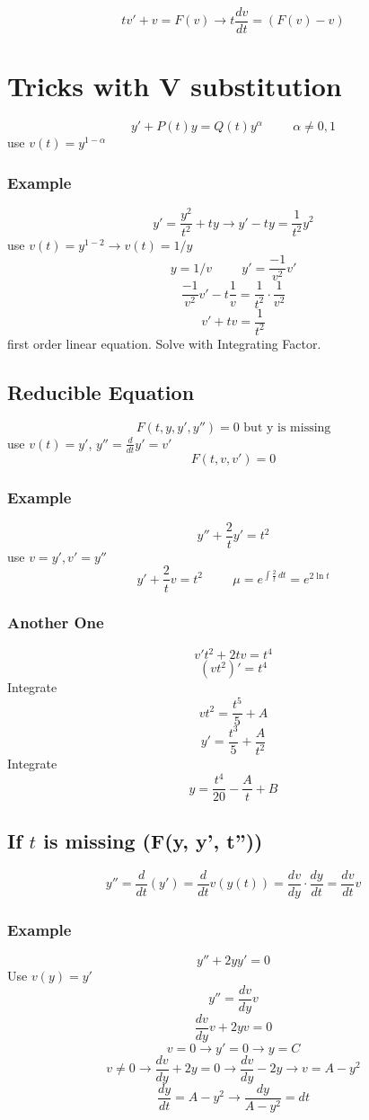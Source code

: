 \documentclass[fleqn]{report}
\newcommand{\hp}{\hspace{1cm}}
\begin{document}
\[
tv' + v = F(v)
\longrightarrow
t \frac{dv}{dt} = \left( F(v) - v \right)
\]


\chapter{Tricks with V substitution}
\[
y' + P(t)y = Q(t) y^\alpha
\hp
\alpha \neq 0, 1
\]
use $v(t) = y^{1 - \alpha}$

\subsection{Example}
\[
y' = \frac{y^2}{t^2} + ty
\rightarrow
y' - ty = \frac{1}{t^2} y^2
\]
use $v(t) = y^{1 - 2} \rightarrow v(t) = 1/y$
\[
y = 1/v \hp
y' = \frac{-1}{v^2}v'
\]
\[
\frac{-1}{v^2}v' - t \frac{1}{v} = \frac{1}{t^2} \cdot \frac{1}{v^2}
\]
\[
v' + tv = \frac{1}{t^2}
\]
first order linear equation. Solve with Integrating Factor.

\section{Reducible Equation}

\[
F(t, y, y', y'') = 0 \textrm{ but y is missing}
\]
use $v(t) = y'$, $y'' = \frac{d}{dt} y' = v'$
\[
F(t, v, v') = 0
\]

\subsection{Example}
\[
y'' + \frac{2}{t}y' = t^2
\]
use $v = y', v' = y''$
\[
y' + \frac{2}{t} v = t^2
\hp
\mu = e^{\int \frac{2}{t} \, dt}
=
e^{2 \ln t}
\]

\subsection{Another One}
\[
v't^2 + 2tv = t^4
\]
\[
(vt^2)' = t^4
\]
Integrate
\[
vt^2 = \frac{t^5}{5} + A
\]
\[
y' = \frac{t^3}{5} + \frac{A}{t^2}
\]
Integrate
\[
y = \frac{t^4}{20} - \frac{A}{t} + B
\]

\section{If $t$ is missing (F(y, y', t''))}
\[
y'' = \frac{d}{dt}(y') = \frac{d}{dt}v(y(t)) = \frac{dv}{dy} \cdot \frac{dy}{dt} = \frac{dv}{dt}v
\]

\subsection{Example}
\[
y'' + 2yy' = 0
\]
Use $v(y) = y'$
\[
y'' = \frac{dv}{dy}v
\]
\[
\frac{dv}{dy} v + 2yv = 0
\]
\[
v = 0 \longrightarrow y' = 0 \longrightarrow y = C
\]
\[
v \neq 0 \longrightarrow 
\frac{dv}{dy} + 2y = 0 \longrightarrow 
\frac{dv}{dy} -2y \rightarrow 
v = A - y^2
\]
\[
\frac{dy}{dt} = A - y^2 \longrightarrow
\frac{dy}{A - y^2} = dt
\]
\end{document}

